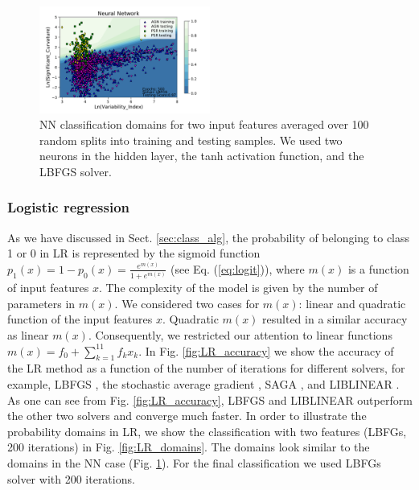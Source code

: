 \documentclass[referee]{aa} %
\begin{document}
\begin{figure}[h]
\centering
\includegraphics[width=0.5\textwidth]{plots/classification_domains/nn_300_lbfgs.pdf}
\caption{NN classification domains for two input features
averaged over 100 random splits into training and testing samples.
We used two neurons in the hidden layer, the tanh activation function, and the LBFGS solver. 
}
\label{fig:NN_domains}
\end{figure}

\subsubsection{Logistic regression}

As we have discussed in Sect. \ref{sec:class_alg}, 
the probability of belonging to class 1 or 0 in LR is represented by the sigmoid function
$p_1(x) = 1 - p_0(x) = \frac{e^{m(x)}}{1 + e^{m(x)}}$ (see Eq. (\ref{eq:logit})),
where $m(x)$ is a function of input features $x$.
The complexity of the model is given by the number of parameters in $m(x)$.
We considered two cases for $m(x)$: linear and quadratic function of the input features $x$.
Quadratic $m(x)$ resulted in a similar accuracy as linear $m(x)$.
Consequently, we restricted our attention to linear functions $m(x) = f_0 + \sum_{k = 1}^{11} f_k x_k$.
In Fig. \ref{fig:LR_accuracy} we show the accuracy of the LR method as a function of the number of iterations
for different solvers, for example, LBFGS \citep{lbfgs}, the stochastic average gradient \citep[SAG;][]{sag}, SAGA \citep[a variant of SAG,][]{saga},
and LIBLINEAR \citep[a special solver for LR and support vector machine classifications,][]{ll}.
As one can see from Fig. \ref{fig:LR_accuracy}, LBFGS and LIBLINEAR outperform the other two solvers and converge much faster.
In order to illustrate the probability domains in LR, we show the classification with two features (LBFGs, 200 iterations)
in Fig. \ref{fig:LR_domains}. The domains look similar to the domains in the NN case (Fig. \ref{fig:NN_domains}).
For the final classification we used LBFGs solver with 200 iterations.
\end{document}
